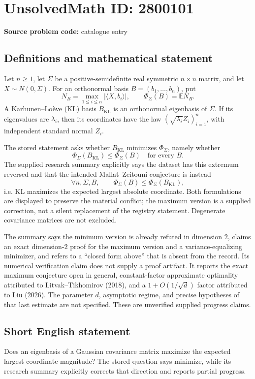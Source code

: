 \documentclass[11pt]{article}
\begin{document}
\section*{UnsolvedMath ID: 2800101}
\textbf{Source problem code:} catalogue entry
\subsection{Definitions and mathematical statement}
Let \(n\ge1\), let \(\Sigma\) be a positive-semidefinite real symmetric \(n\times n\) matrix, and let \(X\sim N(0,\Sigma)\). For an orthonormal basis \(B=(b_1,\ldots,b_n)\), put
\[
N_B=\max_{1\le i\le n}|\langle X,b_i\rangle|,\qquad
\Phi_\Sigma(B)=\mathbb E N_B.
\]
A Karhunen--Lo\`eve (KL) basis \(B_{\mathrm{KL}}\) is an orthonormal eigenbasis of \(\Sigma\). If its eigenvalues are \(\lambda_i\), then its coordinates have the law \((\sqrt{\lambda_i}Z_i)_{i=1}^n\), with independent standard normal \(Z_i\).

The stored statement asks whether \(B_{\mathrm{KL}}\) minimizes \(\Phi_\Sigma\), namely whether
\[
\Phi_\Sigma(B_{\mathrm{KL}})\le\Phi_\Sigma(B)\quad\text{for every }B.
\]
The supplied research summary explicitly says the dataset has this extremum reversed and that the intended Mallat--Zeitouni conjecture is instead
\[
\forall n,\Sigma,B,\qquad
\Phi_\Sigma(B)\le\Phi_\Sigma(B_{\mathrm{KL}}),
\]
i.e. KL maximizes the expected largest absolute coordinate. Both formulations are displayed to preserve the material conflict; the maximum version is a supplied correction, not a silent replacement of the registry statement. Degenerate covariance matrices are not excluded.

The summary says the minimum version is already refuted in dimension \(2\), claims an exact dimension-\(2\) proof for the maximum version and a variance-equalizing minimizer, and refers to a ``closed form above'' that is absent from the record. Its numerical verification claim does not supply a proof artifact. It reports the exact maximum conjecture open in general, constant-factor approximate optimality attributed to Litvak--Tikhomirov (2018), and a \(1+O(1/\sqrt d)\) factor attributed to Liu (2026). The parameter \(d\), asymptotic regime, and precise hypotheses of that last estimate are not specified. These are unverified supplied progress claims.
\subsection{Short English statement}
Does an eigenbasis of a Gaussian covariance matrix maximize the expected largest coordinate magnitude? The stored question says minimize, while its research summary explicitly corrects that direction and reports partial progress.
\end{document}
